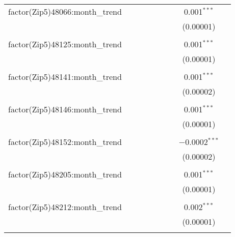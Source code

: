 \begin{table}[H]
{\begin{tabular}{@{\extracolsep{5pt}}lcccccccc}
  factor(Zip5)48066:month\_trend &  &  &  &  &  &  & 0.001$^{***}$ &  \\  

   &  &  &  &  &  &  & (0.00001) &  \\  

   & & & & & & & & \\  

  factor(Zip5)48125:month\_trend &  &  &  &  &  &  & 0.001$^{***}$ &  \\  

   &  &  &  &  &  &  & (0.00001) &  \\  

   & & & & & & & & \\  

  factor(Zip5)48141:month\_trend &  &  &  &  &  &  & 0.001$^{***}$ &  \\  

   &  &  &  &  &  &  & (0.00002) &  \\  

   & & & & & & & & \\  

  factor(Zip5)48146:month\_trend &  &  &  &  &  &  & 0.001$^{***}$ &  \\  

   &  &  &  &  &  &  & (0.00001) &  \\  

   & & & & & & & & \\  

  factor(Zip5)48152:month\_trend &  &  &  &  &  &  & $-$0.0002$^{***}$ &  \\  

   &  &  &  &  &  &  & (0.00002) &  \\  

   & & & & & & & & \\  

  factor(Zip5)48205:month\_trend &  &  &  &  &  &  & 0.001$^{***}$ &  \\  

   &  &  &  &  &  &  & (0.00001) &  \\  

   & & & & & & & & \\  

  factor(Zip5)48212:month\_trend &  &  &  &  &  &  & 0.002$^{***}$ &  \\  

   &  &  &  &  &  &  & (0.00001) &  \\  

   & & & & & & & & \\  


\end{tabular}}
\end{table}
